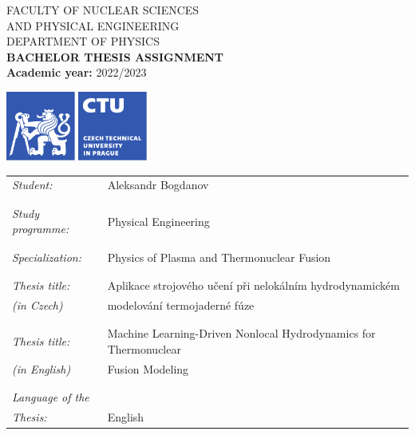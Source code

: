 \documentclass[11pt,a4paper]{article}
\begin{document}
\pagestyle{empty}

\parbox{0.65\textwidth}{%
{\footnotesize FACULTY OF NUCLEAR SCIENCES \\%
               AND PHYSICAL ENGINEERING \\%
               DEPARTMENT OF PHYSICS}\\[3mm]
{\bfseries\Large BACHELOR THESIS ASSIGNMENT}\\[3mm]
{\bf Academic year:} 2022/2023
}
\parbox{0.36\textwidth}{%
  \includegraphics[width=0.35\textwidth]{logo_CVUT_EN_Pantone}
}

\vspace*{10ex}

\hspace{-1ex}\begin{tabular}{ll}
{\it Student:}          & Aleksandr Bogdanov\\\\\\
{\it Study programme:}  & Physical Engineering\\\\\\
{\it Specialization:}   & Physics of Plasma and Thermonuclear Fusion\\\\\\
{\it Thesis title:  }   & Aplikace strojového učení při nelokálním hydrodynamickém  \\ 
{\it (in Czech)       } & modelování termojaderné fúze \\\\\\ 
{\it Thesis title:  }   & Machine Learning-Driven Nonlocal Hydrodynamics
                          for Thermonuclear  \\
{\it (in English) }     & Fusion Modeling \\\\\\
{\it Language of the}   & \\
{\it Thesis:}           & English
\end{tabular}

\vspace*{10ex}
\end{document}
